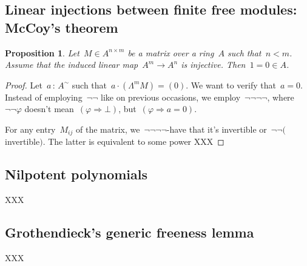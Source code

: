 \documentclass{amsart}
\theoremstyle{definition}
\theoremstyle{plain}
\newtheorem{prop}[defn]{Proposition}
\theoremstyle{remark}
\newcommand{\?}{\,{:}\,}
\newcommand{\negg}{\neg\!\!\!\neg}
\begin{document}
\subsection{Linear injections between finite free modules: McCoy's theorem}

\begin{prop}\label{injection}
Let~$M \in A^{n \times m}$ be a matrix over a ring~$A$ such that~$n
< m$. Assume that the induced linear map~$A^m \to A^n$ is injective. Then~$1 =
0 \in A$.
\end{prop}

\begin{proof}Let~$a \? A^\sim$ such that~$a \cdot (\Lambda^m M) = (0)$. We want
to verify that~$a = 0$. Instead of employing~$\neg\neg$ like on previous
occasions, we employ~$\negg\negg$, where~$\negg\varphi$ doesn't mean~$(\varphi
\Rightarrow \bot)$, but~$(\varphi \Rightarrow a = 0)$.

For any entry~$M_{ij}$ of the matrix, we~$\negg\negg$-have that it's invertible
or~$\negg($invertible$)$. The latter is equivalent to some power XXX
\end{proof}


\subsection{Nilpotent polynomials}

XXX

\subsection{Grothendieck's generic freeness lemma}

XXX
\end{document}
